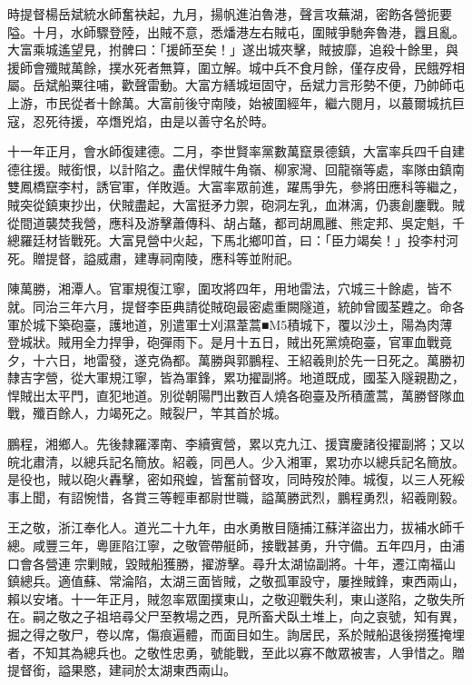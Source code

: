 \begin{pinyinscope}
時提督楊岳斌統水師奮袂起，九月，揚帆進泊魯港，聲言攻蕪湖，密飭各營扼要隘。十月，水師驟登陸，出賊不意，悉燔港左右賊屯，圍賊爭馳奔魯港，囂且亂。大富乘城遙望見，拊髀曰：「援師至矣！」遂出城夾擊，賊披靡，追殺十餘里，與援師會殲賊萬餘，撲水死者無算，圍立解。城中兵不食月餘，僅存皮骨，民餓殍相屬。岳斌船粟往哺，歡聲雷動。大富方繕城垣固守，岳斌力言形勢不便，乃帥師屯上游，市民從者十餘萬。大富前後守南陵，始被圍經年，繼六閱月，以蕞爾城抗巨寇，忍死待援，卒熸兇焰，由是以善守名於時。

十一年正月，會水師復建德。二月，李世賢率黨數萬竄景德鎮，大富率兵四千自建德往援。賊銜恨，以計陷之。盡伏悍賊牛角嶺、柳家灣、回龍嶺等處，率隊由鎮南雙鳳橋竄李村，誘官軍，佯敗遁。大富率眾前進，躍馬爭先，參將田應科等繼之，賊突從鎮東抄出，伏賊盡起，大富挺矛力禦，砲洞左乳，血淋漓，仍裹創鏖戰。賊從間道襲焚我營，應科及游擊蕭傳科、胡占鼇，都司胡鳳雝、熊定邦、吳定魁，千總羅廷材皆戰死。大富見營中火起，下馬北鄉叩首，曰：「臣力竭矣！」投李村河死。贈提督，謚威肅，建專祠南陵，應科等並附祀。

陳萬勝，湘潭人。官軍規復江寧，圍攻將四年，用地雷法，穴城三十餘處，皆不就。同治三年六月，提督李臣典請從賊砲最密處重闕隧道，統帥曾國荃韙之。命各軍於城下築砲臺，護地道，別遣軍士刈濕葦蒿■M5積城下，覆以沙土，陽為肉薄登城狀。賊用全力捍爭，砲彈雨下。是月十五日，賊出死黨燒砲臺，官軍血戰竟夕，十六日，地雷發，遂克偽都。萬勝與郭鵬程、王紹羲則於先一日死之。萬勝初隸吉字營，從大軍規江寧，皆為軍鋒，累功擢副將。地道既成，國荃入隧親勘之，悍賊出太平門，直犯地道。別從朝陽門出數百人燒各砲臺及所積蘆蒿，萬勝督隊血戰，殲百餘人，力竭死之。賊裂尸，竿其首於城。

鵬程，湘鄉人。先後隸羅澤南、李續賓營，累以克九江、援寶慶諸役擢副將；又以皖北肅清，以總兵記名簡放。紹羲，同邑人。少入湘軍，累功亦以總兵記名簡放。是役也，賊以砲火轟擊，密如飛蝗，皆奮前督攻，同時歿於陣。城復，以三人死綏事上聞，有詔惋惜，各賞三等輕車都尉世職，謚萬勝武烈，鵬程勇烈，紹羲剛毅。

王之敬，浙江奉化人。道光二十九年，由水勇散目隨捕江蘇洋盜出力，拔補水師千總。咸豐三年，粵匪陷江寧，之敬管帶艇師，接戰甚勇，升守備。五年四月，由浦口會各營連宗剿賊，毀賊船獲勝，擢游擊。尋升太湖協副將。十年，遷江南福山鎮總兵。適值蘇、常淪陷，太湖三面皆賊，之敬孤軍設守，屢挫賊鋒，東西兩山，賴以安堵。十一年正月，賊忽率眾圍撲東山，之敬迎戰失利，東山遂陷，之敬失所在。嗣之敬之子祖培尋父尸至教場之西，見所畜犬臥土堆上，向之哀號，知有異，掘之得之敬尸，卷以席，傷痕遍體，而面目如生。詢居民，系於賊船退後撈獲掩埋者，不知其為總兵也。之敬性忠勇，號能戰，至此以寡不敵眾被害，人爭惜之。贈提督銜，謚果愍，建祠於太湖東西兩山。


\end{pinyinscope}
